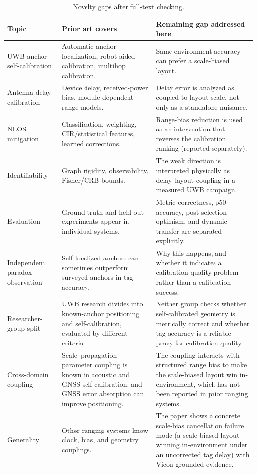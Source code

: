 \documentclass[11pt,a4paper]{article}
\begin{document}
\begin{table}[H]
\centering
\caption{Novelty gaps after full-text checking.}
\small
\begin{tabular}{@{}p{36mm}p{49mm}p{49mm}@{}}
\toprule
Topic & Prior art covers & Remaining gap addressed here \\
\midrule
UWB anchor self-calibration & Automatic anchor localization, robot-aided calibration, multihop calibration. & Same-environment accuracy can prefer a scale-biased layout. \\
Antenna delay calibration & Device delay, received-power bias, module-dependent range models. & Delay error is analyzed as coupled to layout scale, not only as a standalone nuisance. \\
NLOS mitigation & Classification, weighting, CIR/statistical features, learned corrections. & Range-bias reduction is used as an intervention that reverses the calibration ranking (reported separately). \\
Identifiability & Graph rigidity, observability, Fisher/CRB bounds. & The weak direction is interpreted physically as delay--layout coupling in a measured UWB campaign. \\
Evaluation & Ground truth and held-out experiments appear in individual systems. & Metric correctness, p50 accuracy, post-selection optimism, and dynamic transfer are separated explicitly. \\
Independent paradox observation & Self-localized anchors can sometimes outperform surveyed anchors in tag accuracy. & Why this happens, and whether it indicates a calibration quality problem rather than a calibration success. \\
Researcher-group split & UWB research divides into known-anchor positioning and self-calibration, evaluated by different criteria. & Neither group checks whether self-calibrated geometry is metrically correct and whether tag accuracy is a reliable proxy for calibration quality. \\
Cross-domain coupling & Scale--propagation-parameter coupling is known in acoustic and GNSS self-calibration, and GNSS error absorption can improve positioning. & The coupling interacts with structured range bias to make the scale-biased layout win in-environment, which has not been reported in prior ranging systems. \\
Generality & Other ranging systems know clock, bias, and geometry couplings. & The paper shows a concrete scale-bias cancellation failure mode (a scale-biased layout winning in-environment under an uncorrected tag delay) with Vicon-grounded evidence. \\
\bottomrule
\end{tabular}
\end{table}
\end{document}
